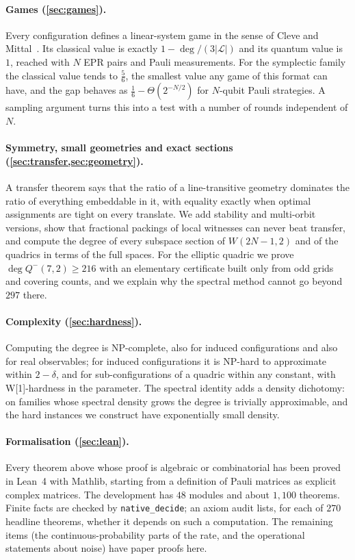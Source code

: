 \documentclass[a4paper,onecolumn,11pt,unpublished,nopdfoutputerror]{quantumarticle}
\theoremstyle{definition}
\renewcommand{\deg}{\operatorname{deg}}
\newcommand{\Lines}{\mathcal{L}}
\newcommand{\W}[1]{W(#1,2)}
\newcommand{\Qm}[1]{Q^{-}(#1,2)}
\begin{document}
\paragraph{Games (\cref{sec:games}).} Every configuration defines a linear-system game in the sense of Cleve and
Mittal~\cite{CleveMittal2014}. Its classical value is exactly $1-\deg/(3|\Lines|)$ and its quantum value is $1$,
reached with $N$ EPR pairs and Pauli measurements. For the symplectic family the classical value tends to
$\tfrac56$, the smallest value any game of this format can have, and the gap behaves as
$\tfrac16-\Theta(2^{-N/2})$ for $N$-qubit Pauli strategies. A sampling argument turns this into a test with a
number of rounds independent of $N$.

\paragraph{Symmetry, small geometries and exact sections (\cref{sec:transfer,sec:geometry}).} A transfer theorem
says that the ratio of a line-transitive geometry dominates the ratio of everything embeddable in it, with
equality exactly when optimal assignments are tight on every translate. We add stability and multi-orbit
versions, show that fractional packings of local witnesses can never beat transfer, and compute the degree of
every subspace section of $\W{2N-1}$ and of the quadrics in terms of the full spaces. For the elliptic quadric we
prove $\deg\Qm7\ge216$ with an elementary certificate built only from odd grids and covering counts, and we
explain why the spectral method cannot go beyond $297$ there.

\paragraph{Complexity (\cref{sec:hardness}).} Computing the degree is NP-complete, also for induced configurations
and also for real observables; for induced configurations it is NP-hard to approximate within $2-\delta$, and for
sub-configurations of a quadric within any constant, with W[1]-hardness in the parameter. The spectral identity
adds a density dichotomy: on families whose spectral density grows the degree is trivially approximable, and the
hard instances we construct have exponentially small density.

\paragraph{Formalisation (\cref{sec:lean}).} Every theorem above whose proof is algebraic or combinatorial has been
proved in Lean~4 with Mathlib, starting from a definition of Pauli matrices as explicit complex matrices. The
development has $48$ modules and about $1{,}100$ theorems. Finite facts are checked by \texttt{native\_decide};
an axiom audit lists, for each of $270$ headline theorems, whether it depends on such a computation. The
remaining items (the continuous-probability parts of the rate, and the operational statements about noise) have
paper proofs here.
\end{document}
